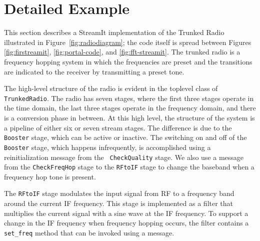 \section{Detailed Example}
\label{sec:example}
This section describes a StreamIt implementation of the Trunked Radio
illustrated in Figure~\ref{fig:radiodiagram}; the code itself is
spread between Figures \ref{fig:firstreamit}, \ref{fig:portal-code},
and \ref{fig:fft-streamit}.  The trunked radio is a frequency hopping
system in which the frequencies are preset and the transitions are
indicated to the receiver by transmitting a preset tone.


The high-level structure of the radio is evident in the toplevel class
of {\tt TrunkedRadio}.  The radio has seven stages, where the first
three stages operate in the time domain, the last three stages operate
in the frequency domain, and there is a conversion phase in between.
At this high level, the structure of the system is a pipeline of
either six or seven stream stages. The difference is due to the {\tt
Booster} stage, which can be active or inactive. The switching on and
off of the {\tt Booster} stage, which happens infrequently, is
accomplished using a reinitialization message from the {\tt
CheckQuality} stage. We also use a message from the {\tt CheckFreqHop}
stage to the {\tt RFtoIF} stage to change the baseband when a
frequency hop tone is present.

The {\tt RFtoIF} stage modulates the input signal from RF to a
frequency band around the current IF frequency. This stage is
implemented as a filter that multiplies the current signal with a sine
wave at the IF frequency.  To support a change in the IF frequency
when frequency hopping occurs, the filter contains a {\tt set\_freq}
method that can be invoked using a message.


